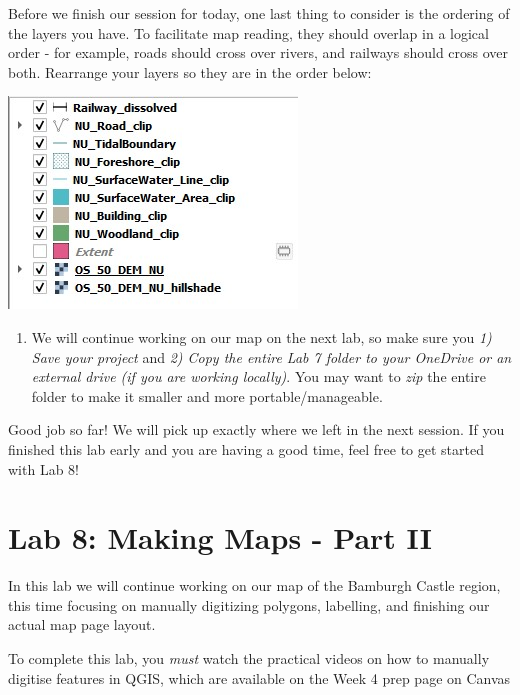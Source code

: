\documentclass[
  letterpaper,
  DIV=11,
  numbers=noendperiod]{scrreprt}
\providecommand{\tightlist}{%
  \setlength{\itemsep}{0pt}\setlength{\parskip}{0pt}}\usepackage{longtable,booktabs,array}
\begin{document}
Before we finish our session for today, one last thing to consider is
the ordering of the layers you have. To facilitate map reading, they
should overlap in a logical order - for example, roads should cross over
rivers, and railways should cross over both. Rearrange your layers so
they are in the order below:

\includegraphics{images/lab_7/lab7_fig16_layer_order.jpg}

\begin{enumerate}
\def\labelenumi{(\arabic{enumi})}
\setcounter{enumi}{219}
\tightlist
\item
  We will continue working on our map on the next lab, so make sure you
  \emph{1) Save your project} and \emph{2) Copy the entire Lab 7 folder
  to your OneDrive or an external drive (if you are working locally)}.
  You may want to \emph{zip} the entire folder to make it smaller and
  more portable/manageable.
\end{enumerate}

Good job so far! We will pick up exactly where we left in the next
session. If you finished this lab early and you are having a good time,
feel free to get started with Lab 8!

\chapter{Lab 8: Making Maps - Part II}\label{sec-carto2}

In this lab we will continue working on our map of the Bamburgh Castle
region, this time focusing on manually digitizing polygons, labelling,
and finishing our actual map page layout.

\begin{tcolorbox}[enhanced jigsaw, coltitle=black, toprule=.15mm, breakable, opacitybacktitle=0.6, left=2mm, colback=white, leftrule=.75mm, rightrule=.15mm, colbacktitle=quarto-callout-warning-color!10!white, toptitle=1mm, titlerule=0mm, colframe=quarto-callout-warning-color-frame, arc=.35mm, bottomtitle=1mm, opacityback=0, bottomrule=.15mm, title=\textcolor{quarto-callout-warning-color}{\faExclamationTriangle}\hspace{0.5em}{Warning}]

To complete this lab, you \emph{must} watch the practical videos on how
to manually digitise features in QGIS, which are available on the Week 4
prep page on Canvas

\end{tcolorbox}
\end{document}

